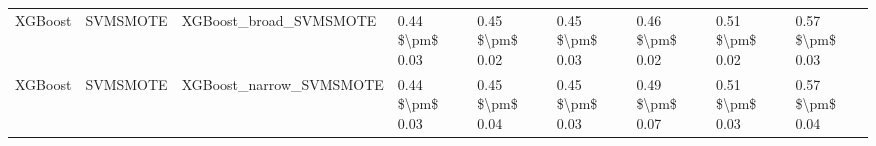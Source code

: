 \begin{tabular}{lllllllll}
                        XGBoost &                      SVMSMOTE &                       XGBoost\_broad\_SVMSMOTE & 0.44 \$\textbackslash pm\$ 0.03 &           0.45 \$\textbackslash pm\$ 0.02 &       0.45 \$\textbackslash pm\$ 0.03 &        0.46 \$\textbackslash pm\$ 0.02 &                         0.51 \$\textbackslash pm\$ 0.02 &     0.57 \$\textbackslash pm\$ 0.03 \\
                        XGBoost &                      SVMSMOTE &                      XGBoost\_narrow\_SVMSMOTE & 0.44 \$\textbackslash pm\$ 0.03 &           0.45 \$\textbackslash pm\$ 0.04 &       0.45 \$\textbackslash pm\$ 0.03 &        0.49 \$\textbackslash pm\$ 0.07 &                         0.51 \$\textbackslash pm\$ 0.03 &     0.57 \$\textbackslash pm\$ 0.04 \\
\bottomrule
\end{tabular}
